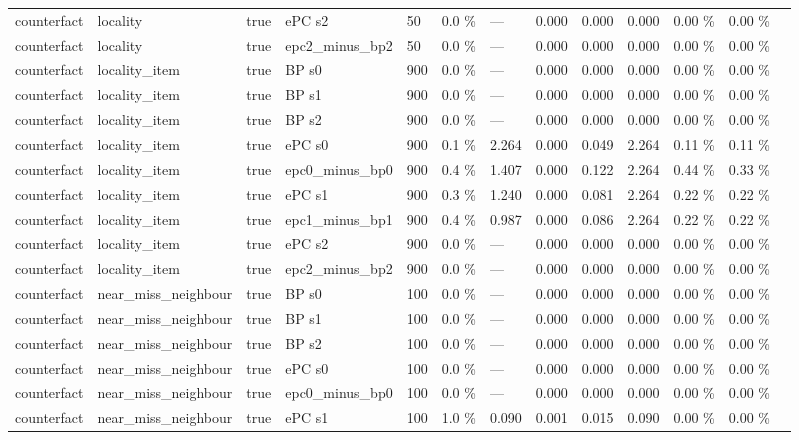 \documentclass[10pt,a4paper]{article}
\begin{document}
\begin{center}
\begin{tabularx}{\textwidth}{@{}p{}XXXXXXXXXXXX@{}}
counterfact & locality & true & ePC s2 & 50 & 0.0 \% & — & 0.000 & 0.000 & 0.000 & 0.00 \% & 0.00 \% &  \\
counterfact & locality & true & epc2\_minus\_bp2 & 50 & 0.0 \% & — & 0.000 & 0.000 & 0.000 & 0.00 \% & 0.00 \% &  \\
counterfact & locality\_item & true & BP s0 & 900 & 0.0 \% & — & 0.000 & 0.000 & 0.000 & 0.00 \% & 0.00 \% &  \\
counterfact & locality\_item & true & BP s1 & 900 & 0.0 \% & — & 0.000 & 0.000 & 0.000 & 0.00 \% & 0.00 \% &  \\
counterfact & locality\_item & true & BP s2 & 900 & 0.0 \% & — & 0.000 & 0.000 & 0.000 & 0.00 \% & 0.00 \% &  \\
counterfact & locality\_item & true & ePC s0 & 900 & 0.1 \% & 2.264 & 0.000 & 0.049 & 2.264 & 0.11 \% & 0.11 \% &  \\
counterfact & locality\_item & true & epc0\_minus\_bp0 & 900 & 0.4 \% & 1.407 & 0.000 & 0.122 & 2.264 & 0.44 \% & 0.33 \% &  \\
counterfact & locality\_item & true & ePC s1 & 900 & 0.3 \% & 1.240 & 0.000 & 0.081 & 2.264 & 0.22 \% & 0.22 \% &  \\
counterfact & locality\_item & true & epc1\_minus\_bp1 & 900 & 0.4 \% & 0.987 & 0.000 & 0.086 & 2.264 & 0.22 \% & 0.22 \% &  \\
counterfact & locality\_item & true & ePC s2 & 900 & 0.0 \% & — & 0.000 & 0.000 & 0.000 & 0.00 \% & 0.00 \% &  \\
counterfact & locality\_item & true & epc2\_minus\_bp2 & 900 & 0.0 \% & — & 0.000 & 0.000 & 0.000 & 0.00 \% & 0.00 \% &  \\
counterfact & near\_miss\_neighbour & true & BP s0 & 100 & 0.0 \% & — & 0.000 & 0.000 & 0.000 & 0.00 \% & 0.00 \% &  \\
counterfact & near\_miss\_neighbour & true & BP s1 & 100 & 0.0 \% & — & 0.000 & 0.000 & 0.000 & 0.00 \% & 0.00 \% &  \\
counterfact & near\_miss\_neighbour & true & BP s2 & 100 & 0.0 \% & — & 0.000 & 0.000 & 0.000 & 0.00 \% & 0.00 \% &  \\
counterfact & near\_miss\_neighbour & true & ePC s0 & 100 & 0.0 \% & — & 0.000 & 0.000 & 0.000 & 0.00 \% & 0.00 \% &  \\
counterfact & near\_miss\_neighbour & true & epc0\_minus\_bp0 & 100 & 0.0 \% & — & 0.000 & 0.000 & 0.000 & 0.00 \% & 0.00 \% &  \\
counterfact & near\_miss\_neighbour & true & ePC s1 & 100 & 1.0 \% & 0.090 & 0.001 & 0.015 & 0.090 & 0.00 \% & 0.00 \% &  \\

\end{tabularx}
\end{center}
\end{document}

